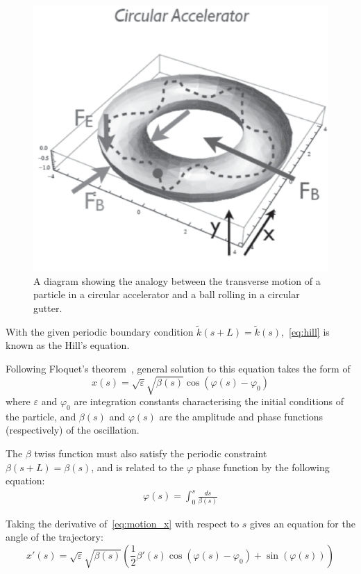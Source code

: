 \documentclass[11pt]{report}
\begin{document}
\begin{figure}[h]
  \centering
  \includegraphics*[width=0.6\linewidth]{guttering}
  \caption{A diagram showing the analogy between the transverse motion of a particle in a circular accelerator and a ball rolling in a circular gutter.}\label{fig:guttering}
\end{figure}

With the given periodic boundary condition $\tilde k(s+L)=\tilde{k}(s)$,~\ref{eq:hill} is known as the Hill's equation. 

Following Floquet's theorem~\cite{Rossbach:247501}, general solution to this equation takes the form of
\begin{equation}
x(s) =\sqrt{\varepsilon}\sqrt{\beta(s)}\cos(\varphi(s)-\varphi_0)
\label{eq:motion_x}
\end{equation} where $\varepsilon$ and $\varphi_0$ are integration constants characterising the initial conditions of the particle, and $\beta(s)$ and $\varphi(s)$ are the amplitude and phase functions (respectively) of the oscillation.

The $\beta$ twiss function must also satisfy the periodic constraint $\beta(s+L)=\beta(s)$, and is related to the $\varphi$ phase function by the following equation:
\begin{eqnarray}
  \varphi(s) = \int^s_0\frac{ds}{\beta(s)}
  \label{eq:phase_and_beta}
\end{eqnarray}


Taking the derivative of~\eqref{eq:motion_x} with respect to $s$ gives an equation for the angle of the trajectory:
\begin{equation}
x'(s)=\sqrt{\varepsilon}\sqrt{\beta(s)}\left(\frac12\beta'(s)\cos(\varphi(s)-\varphi_0)+\sin(\varphi(s))\right)
\label{eq:motion_px}
\end{equation}
\end{document}
